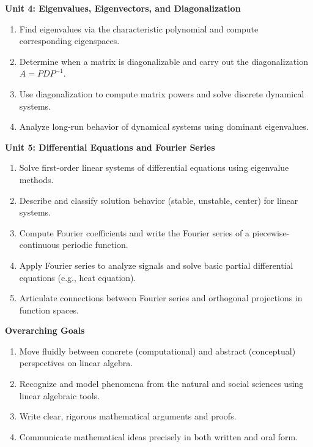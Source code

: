 \documentclass{amsart}
\begin{document}
\bigskip

\textbf{Unit 4: Eigenvalues, Eigenvectors, and Diagonalization}
\begin{enumerate}[leftmargin=2em, resume]
    \item Find eigenvalues via the characteristic polynomial and compute corresponding eigenspaces.
    \item Determine when a matrix is diagonalizable and carry out the diagonalization $A = PDP^{-1}$.
    \item Use diagonalization to compute matrix powers and solve discrete dynamical systems.
    \item Analyze long-run behavior of dynamical systems using dominant eigenvalues.
\end{enumerate}

\bigskip

\textbf{Unit 5: Differential Equations and Fourier Series}
\begin{enumerate}[leftmargin=2em, resume]
    \item Solve first-order linear systems of differential equations using eigenvalue methods.
    \item Describe and classify solution behavior (stable, unstable, center) for linear systems.
    \item Compute Fourier coefficients and write the Fourier series of a piecewise-continuous periodic function.
    \item Apply Fourier series to analyze signals and solve basic partial differential equations (e.g., heat equation).
    \item Articulate connections between Fourier series and orthogonal projections in function spaces.
\end{enumerate}

\bigskip

\textbf{Overarching Goals}
\begin{enumerate}[leftmargin=2em, resume]
    \item Move fluidly between concrete (computational) and abstract (conceptual) perspectives on linear algebra.
    \item Recognize and model phenomena from the natural and social sciences using linear algebraic tools.
    \item Write clear, rigorous mathematical arguments and proofs.
    \item Communicate mathematical ideas precisely in both written and oral form.
\end{enumerate}
\end{document}

